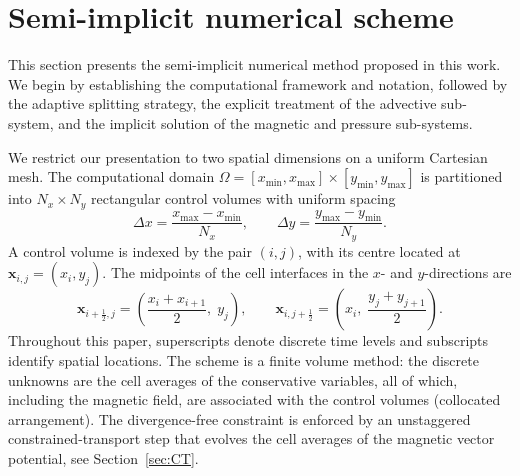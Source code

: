 \documentclass[a4paper,fleqn]{cas-sc}
\theoremstyle{remark}
\begin{document}
\section{Semi-implicit numerical scheme}
\label{sec:scheme}

This section presents the semi-implicit numerical method proposed in this work. We
begin by establishing the computational framework and notation, followed by the
adaptive splitting strategy, the explicit treatment of the advective sub-system,
and the implicit solution of the magnetic and pressure sub-systems.

We restrict our presentation to two spatial dimensions on a uniform Cartesian mesh. The computational domain
$\Omega=[x_{\min},x_{\max}]\times[y_{\min},y_{\max}]$ is partitioned into
$N_x\times N_y$ rectangular control volumes with uniform spacing
\begin{equation}
\label{eq:mesh}
\Delta x=\frac{x_{\max}-x_{\min}}{N_x},\qquad
\Delta y=\frac{y_{\max}-y_{\min}}{N_y}.
\end{equation}
A control volume is indexed by the pair $(i,j)$, with its centre located at
$\mathbf x_{i,j}=(x_i,y_j)$. The midpoints of the cell interfaces in the $x$- and
$y$-directions are
\begin{equation}
\label{eq:face_centres}
\mathbf x_{i+\frac12,j}=\left(\frac{x_i+x_{i+1}}{2},\;y_j\right),\qquad
\mathbf x_{i,j+\frac12}=\left(x_i,\;\frac{y_j+y_{j+1}}{2}\right).
\end{equation}
Throughout this paper, superscripts denote discrete time levels and subscripts
identify spatial locations. The scheme is a finite volume method: the discrete
unknowns are the cell averages of the conservative variables, all of which,
including the magnetic field, are associated with the control volumes
(collocated arrangement). The divergence-free constraint is enforced by an
unstaggered constrained-transport step that evolves the cell averages of the
magnetic vector potential, see Section~\ref{sec:CT}.
\end{document}
